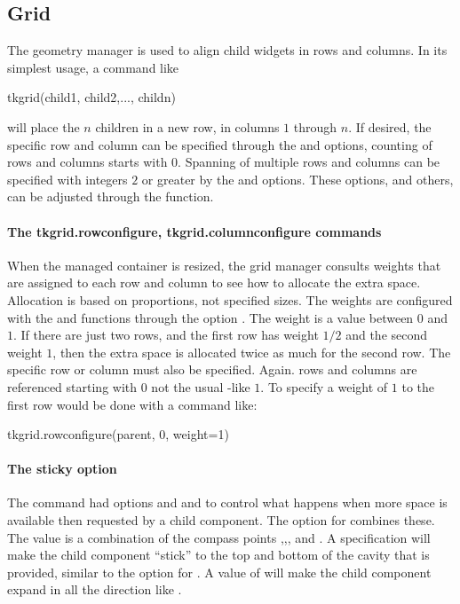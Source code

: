 \subsection{Grid}
\label{sec:tcltk:grid}
The  geometry manager is used to align child widgets
in rows and columns.  In its simplest usage, a command like
\begin{Schunk}
  \begin{Sinput}
tkgrid(child1, child2,..., childn)    
  \end{Sinput}
\end{Schunk}
will place the $n$ children in a new row, in columns $1$ through
$n$. If desired, the specific row and column can be specified through the
 and  options, counting of
rows and columns starts with $0$.  Spanning of multiple rows and columns
can be specified with integers $2$ or greater by the
 and  options. These
options, and others, can be adjusted through the
 function.


\paragraph{The tkgrid.rowconfigure, tkgrid.columnconfigure commands}
When the managed container is resized, the grid manager consults
weights that are assigned to each row and column to see how to
allocate the extra space. Allocation is based on proportions, not
specified sizes. The weights are configured with the
 and 
functions through the option .
The weight is a value between $0$ and $1$. If there are just two rows, and
the first row has weight $1/2$ and the second weight $1$, then the extra
space is allocated twice as much for the second row. The specific row
or column must also be specified. Again. rows and columns are referenced
starting with $0$ not the usual \R-like $1$. To specify a weight of $1$
to the first row would be done with a command like:

%
\begin{Schunk}
\begin{Sinput}
 tkgrid.rowconfigure(parent, 0, weight=1)
\end{Sinput}
\end{Schunk}
%
\paragraph{The sticky option}
The  command had options  and
 and  to control what happens when more space
is available then requested by a child component. The
 option for  combines
these. The value is a combination of the compass points
,,, and . A specification
 will make the child component ``stick'' to the top and
bottom of the cavity that is provided, similar to the 
option for . A value of  will make the
child component expand in all the direction like .

